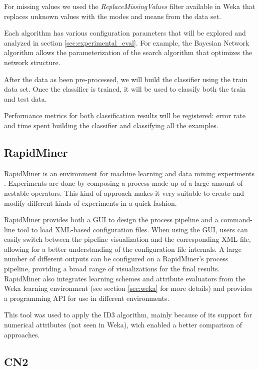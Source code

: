\documentclass[a4paper]{llncs}
\begin{document}
For missing values we used the \textit{ReplaceMissingValues} filter available in Weka that
replaces unknown values with the modes and means from the data set. 

Each algorithm has various configuration parameters that will be explored
and analyzed in section \ref{sec:experimental_eval}.
For example, the Bayesian Network
algorithm allows the parameterization of the search algorithm that optimizes the network structure.

After the data as been pre-processed,
we will build the classifier using the train data set.
Once the classifier is trained, it will be used to classify both the train and test data.

Performance metrics for both classification results will be registered: error rate and time spent
building the classifier and classifying all the examples.

\subsection{RapidMiner}

RapidMiner is an environment for machine learning and data mining experiments 
\cite{4}. Experiments are done by composing a process made up of a large amount
of nestable operators. This kind of approach makes it very suitable to create
and modify different kinds of experiments in a quick fashion.

RapidMiner provides both a GUI to design the process pipeline and a command-line
tool to load XML-based configuration files. When using the GUI, users can easily
switch between the pipeline visualization and the corresponding XML file,
allowing for a better understanding of the configuration file internals. A large
number of different outputs can be configured on a RapidMiner's process 
pipeline, providing a broad range of visualizations for the final results.
RapidMiner also integrates learning schemes and attribute evaluators from the 
Weka \cite{weka} learning environment (see section \ref{sec:weka} for more 
details) and provides a programming API for use in different environments.

This tool was used to apply the ID3 \cite{id3}\cite{1} algorithm, mainly because
of its support for numerical attributes (not seen in Weka), wich enabled a
better comparison of approaches.

\subsection{CN2}
\end{document}
